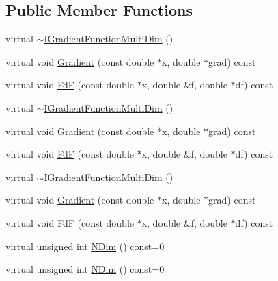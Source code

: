 \subsection*{Public Member Functions}
\begin{DoxyCompactItemize}
\item 
virtual \mbox{\hyperlink{classROOT_1_1Math_1_1IGradientFunctionMultiDim_acf38237d4059f324c24703ec0ee659bb}{$\sim$\+I\+Gradient\+Function\+Multi\+Dim}} ()
\item 
virtual void \mbox{\hyperlink{classROOT_1_1Math_1_1IGradientFunctionMultiDim_ab65a713d2637c69b334d2119ef4f0e26}{Gradient}} (const double $\ast$x, double $\ast$grad) const
\item 
virtual void \mbox{\hyperlink{classROOT_1_1Math_1_1IGradientFunctionMultiDim_a58cefd2806ec7b9d389911800ed60386}{FdF}} (const double $\ast$x, double \&f, double $\ast$df) const
\item 
virtual \mbox{\hyperlink{classROOT_1_1Math_1_1IGradientFunctionMultiDim_acf38237d4059f324c24703ec0ee659bb}{$\sim$\+I\+Gradient\+Function\+Multi\+Dim}} ()
\item 
virtual void \mbox{\hyperlink{classROOT_1_1Math_1_1IGradientFunctionMultiDim_ab65a713d2637c69b334d2119ef4f0e26}{Gradient}} (const double $\ast$x, double $\ast$grad) const
\item 
virtual void \mbox{\hyperlink{classROOT_1_1Math_1_1IGradientFunctionMultiDim_a58cefd2806ec7b9d389911800ed60386}{FdF}} (const double $\ast$x, double \&f, double $\ast$df) const
\item 
virtual \mbox{\hyperlink{classROOT_1_1Math_1_1IGradientFunctionMultiDim_acf38237d4059f324c24703ec0ee659bb}{$\sim$\+I\+Gradient\+Function\+Multi\+Dim}} ()
\item 
virtual void \mbox{\hyperlink{classROOT_1_1Math_1_1IGradientFunctionMultiDim_ab65a713d2637c69b334d2119ef4f0e26}{Gradient}} (const double $\ast$x, double $\ast$grad) const
\item 
virtual void \mbox{\hyperlink{classROOT_1_1Math_1_1IGradientFunctionMultiDim_a58cefd2806ec7b9d389911800ed60386}{FdF}} (const double $\ast$x, double \&f, double $\ast$df) const
\item 
virtual unsigned int \mbox{\hyperlink{classROOT_1_1Math_1_1IGradientFunctionMultiDim_af046a6f630930e59fe5356a9795aec46}{N\+Dim}} () const=0
\item 
virtual unsigned int \mbox{\hyperlink{classROOT_1_1Math_1_1IGradientFunctionMultiDim_af046a6f630930e59fe5356a9795aec46}{N\+Dim}} () const=0
\item 

\end{DoxyCompactItemize}
